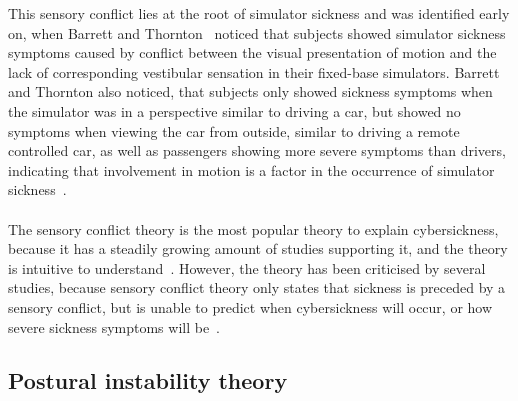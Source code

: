 This sensory conflict lies at the root of simulator sickness and was identified early on, when Barrett and
Thornton~\cite{Barrett1968} noticed that subjects showed simulator sickness symptoms caused by conflict between the
visual presentation of motion and the lack of corresponding vestibular sensation in their fixed-base simulators.
Barrett and Thornton also noticed, that subjects only showed sickness symptoms when the simulator was in a
perspective similar to driving a car, but showed no symptoms when viewing the car from outside, similar to driving a
remote controlled car, as well as passengers showing more severe symptoms than drivers, indicating
that involvement in motion is a factor in the occurrence of simulator sickness~\cite{Tiiro2018,Barrett1968}.
\\
\\
The sensory conflict theory is the most popular theory to explain cybersickness, because it has a steadily growing
amount of studies supporting it, and the theory is intuitive to understand~\cite{Rebenitsch2016,Tiiro2018}.
However, the theory has been criticised by several studies, because sensory conflict theory only states that sickness
is preceded by a sensory conflict, but is unable to predict when cybersickness will occur, or how severe
sickness symptoms will be~\cite{LaViola2000,Rebenitsch2016,Kolasinski1995}.


\subsection{Postural instability theory}\label{subsec:postural-instability-theory}

